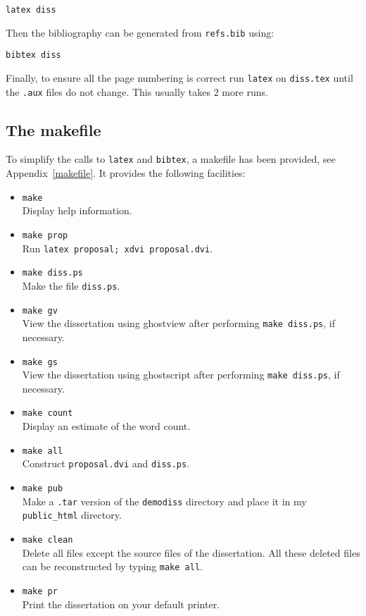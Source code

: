 \documentclass[12pt,twoside,notitlepage]{report}
\begin{document}
{\tt latex diss}

\noindent
Then the bibliography can be generated from {\tt refs.bib} using:

{\tt bibtex diss}

\noindent
Finally, to ensure all the page numbering is correct run {\tt latex}
on {\tt diss.tex} until the {\tt .aux} files do not change.  This
usually takes 2 more runs.

\subsection{The makefile}

To simplify the calls to {\tt latex} and {\tt bibtex},
a makefile has been provided, see Appendix~\ref{makefile}.
It provides the following facilities:

\begin{itemize}

\item{\tt make} \\
 Display help information.

\item{\tt make prop} \\
 Run {\tt latex proposal; xdvi proposal.dvi}.

\item{\tt make diss.ps} \\
 Make the file {\tt diss.ps}.

\item{\tt make gv} \\
 View the dissertation using ghostview after performing
{\tt make diss.ps}, if necessary.

\item{\tt make gs} \\
 View the dissertation using ghostscript after performing
{\tt make diss.ps}, if necessary.

\item{\tt make count} \\
Display an estimate of the word count.

\item{\tt make all} \\
Construct {\tt proposal.dvi} and {\tt diss.ps}.

\item{\tt make pub} \\ Make a {\tt .tar} version of the {\tt demodiss}
directory and place it in my {\tt public\_html} directory.

\item{\tt make clean} \\ Delete all files except the source files of
the dissertation. All these deleted files can be reconstructed by
typing {\tt make all}.

\item{\tt make pr} \\
Print the dissertation on your default printer.

\end{itemize}
\end{document}
